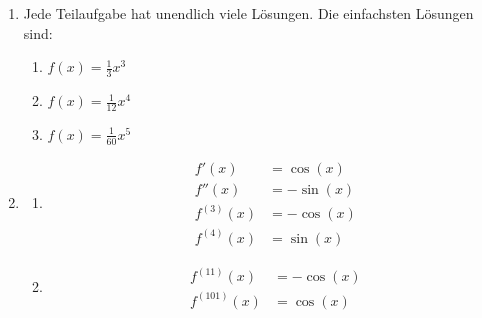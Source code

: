 \begin{enumerate}
\begin{enumerate}
\begin{enumerate}
\begin{align*}
                                  f^{(3)}(x) & = 60x^2 \\
                                  f^{(4)}(x) & = 120x  \\
                                  f^{(5)}(x) & = 120
                              \end{align*}
                        \item
                              \begin{align*}
                                  f'(x)      & = 6x^5   \\
                                  f''(x)     & = 30x^4  \\
                                  f^{(3)}(x) & = 120x^3 \\
                                  f^{(4)}(x) & = 360x^2 \\
                                  f^{(5)}(x) & = 720x
                              \end{align*}
                    \end{enumerate}
              \item \( f^{(5)}(x) = n(n-1)(n-2)(n-3)(n-4)x^{n-5} \)
              \item Ja.
          \end{enumerate}

    \item  Jede Teilaufgabe hat unendlich viele Lösungen. Die einfachsten Lösungen sind:
          \begin{enumerate}
              \item \( f(x) = \frac{1}{3}x^3\)
              \item \( f(x) = \frac{1}{12}x^4  \)
              \item \( f(x) = \frac{1}{60}x^5  \)
          \end{enumerate}

    \item
          \begin{enumerate}
              \item
                    \begin{align*}
                        f'(x)      & = \cos(x)  \\
                        f''(x)     & = -\sin(x) \\
                        f^{(3)}(x) & = -\cos(x) \\
                        f^{(4)}(x) & = \sin(x)
                    \end{align*}
              \item
                    \begin{align*}
                        f^{(11)}(x)  & = -\cos(x) \\
                        f^{(101)}(x) & = \cos(x)
                    \end{align*}
          \end{enumerate}


\end{enumerate}

